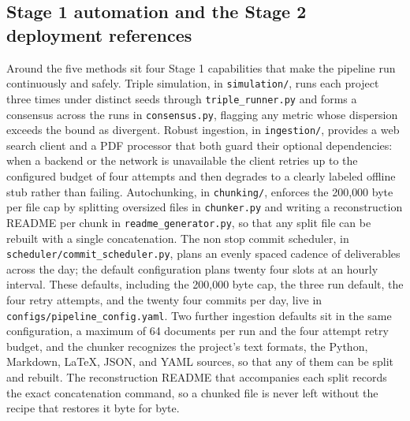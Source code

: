 \subsection{Stage 1 automation and the Stage 2 deployment references}

Around the five methods sit four Stage 1 capabilities that make the pipeline run
continuously and safely. Triple simulation, in \texttt{simulation/}, runs each
project three times under distinct seeds through \texttt{triple\_runner.py} and
forms a consensus across the runs in \texttt{consensus.py}, flagging any metric
whose dispersion exceeds the bound as divergent. Robust ingestion, in
\texttt{ingestion/}, provides a web search client and a PDF processor that both
guard their optional dependencies: when a backend or the network is unavailable
the client retries up to the configured budget of four attempts and then degrades
to a clearly labeled offline stub rather than failing. Autochunking, in
\texttt{chunking/}, enforces the 200{,}000 byte per file cap by splitting
oversized files in \texttt{chunker.py} and writing a reconstruction README per
chunk in \texttt{readme\_generator.py}, so that any split file can be rebuilt with
a single concatenation. The non stop commit scheduler, in
\texttt{scheduler/commit\_scheduler.py}, plans an evenly spaced cadence of
deliverables across the day; the default configuration plans twenty four slots at
an hourly interval. These defaults, including the 200{,}000 byte cap, the three
run default, the four retry attempts, and the twenty four commits per day, live
in \texttt{configs/pipeline\_config.yaml}. Two further ingestion defaults sit in
the same configuration, a maximum of 64 documents per run and the four attempt
retry budget, and the chunker recognizes the project's text formats, the Python,
Markdown, LaTeX, JSON, and YAML sources, so that any of them can be split and
rebuilt. The reconstruction README that accompanies each split records the exact
concatenation command, so a chunked file is never left without the recipe that
restores it byte for byte.


